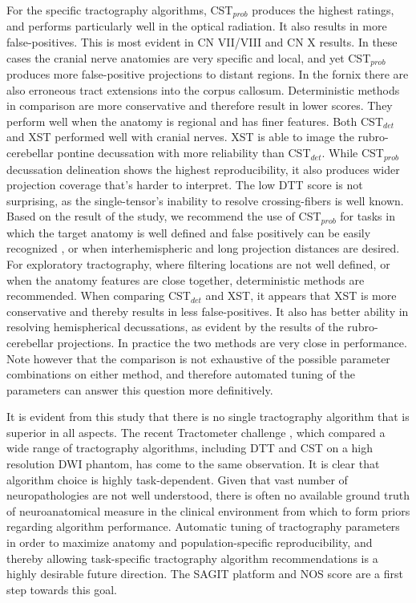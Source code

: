 For the specific tractography algorithms, CST$_{prob}$ produces the highest ratings, and performs particularly well in the optical radiation. It also results in more false-positives. This is most evident in CN VII/VIII and CN X results. In these cases the cranial nerve anatomies are very specific and local, and yet CST$_{prob}$ produces more false-positive projections to distant regions. In the fornix there are also erroneous tract extensions into the corpus callosum. Deterministic methods in comparison are more conservative and therefore result in lower scores. They perform well when the anatomy is regional and has finer features. Both CST$_{det}$ and XST performed well with cranial nerves. XST is able to image the rubro-cerebellar pontine decussation with more reliability than CST$_{det}$. While CST$_{prob}$ decussation delineation shows the highest reproducibility, it also produces wider projection coverage that’s harder to interpret. The low DTT score is not surprising, as the single-tensor's inability to resolve crossing-fibers is well known. Based on the result of the study, we recommend the use of CST$_{prob}$ for tasks in which the target anatomy is well defined and false positively can be easily recognized , or when interhemispheric and long projection distances are desired. For exploratory tractography, where filtering locations are not well defined, or when the anatomy features are close together, deterministic methods are recommended. When comparing CST$_{det}$ and XST, it appears that XST is more conservative and thereby results in less false-positives. It also has better ability in resolving hemispherical decussations, as evident by the results of the rubro-cerebellar projections. In practice the two methods are very close in performance. Note however that the comparison is not exhaustive of the possible parameter combinations on either method, and therefore automated tuning of the parameters can answer this question more definitively. 

It is evident from this study that there is no single tractography algorithm that is superior in all aspects. The recent Tractometer challenge \cite{Neher2015}, which compared a wide range of tractography algorithms, including DTT and CST on a high resolution DWI phantom, has come to the same observation. It is clear that algorithm choice is highly task-dependent. Given that vast number of neuropathologies are not well understood, there is often no available ground truth of neuroanatomical measure in the clinical environment from which to form priors regarding algorithm performance.  Automatic tuning of tractography parameters in order to maximize anatomy and population-specific reproducibility, and thereby allowing task-specific tractography algorithm recommendations is a highly desirable future direction. The SAGIT platform and NOS score are a first step towards this goal. 

